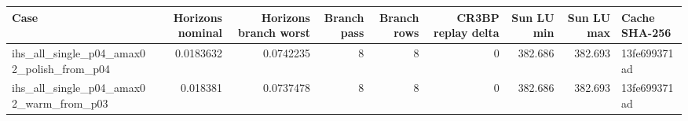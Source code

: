 \begin{tabular}{lrrrrrrrl}
\toprule
Case & Horizons nominal & Horizons branch worst & Branch pass & Branch rows & CR3BP replay delta & Sun LU min & Sun LU max & Cache SHA-256 \\
\midrule
ihs\_all\_single\_p04\_amax02\_polish\_from\_p04 & 0.0183632 & 0.0742235 & 8 & 8 & 0 & 382.686 & 382.693 & 13fe699371ad \\
ihs\_all\_single\_p04\_amax02\_warm\_from\_p03 & 0.018381 & 0.0737478 & 8 & 8 & 0 & 382.686 & 382.693 & 13fe699371ad \\
\bottomrule
\end{tabular}
